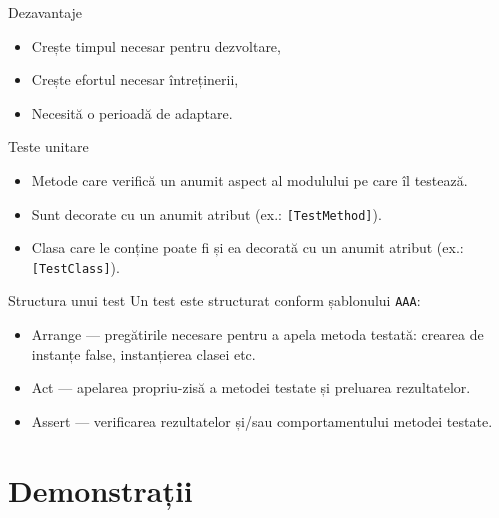 \documentclass[presentation]{beamer}
\begin{document}
\begin{frame}[label={sec:org6d3e55e}]{Dezavantaje}
\begin{itemize}
\item Crește timpul necesar pentru dezvoltare,
\item Crește efortul necesar întreținerii,
\item Necesită o perioadă de adaptare.
\end{itemize}
\end{frame}
\begin{frame}[label={sec:orgfd52fc0},fragile]{Teste unitare}
 \begin{itemize}
\item Metode care verifică un anumit aspect al modulului pe care îl testează.
\item Sunt decorate cu un anumit atribut (ex.: \texttt{[TestMethod]}).
\item Clasa care le conține poate fi și ea decorată cu un anumit atribut (ex.: \texttt{[TestClass]}).
\end{itemize}
\end{frame}
\begin{frame}[label={sec:org8d98d5e},fragile]{Structura unui test}
 Un test este structurat conform șablonului \texttt{AAA}:
\begin{itemize}
\item \alert{Arrange}  --- pregătirile necesare pentru a apela metoda testată: crearea de instanțe false, instanțierea clasei etc.
\item \alert{Act} --- apelarea propriu-zisă a metodei testate și preluarea rezultatelor.
\item \alert{Assert} --- verificarea rezultatelor și/sau comportamentului metodei testate.
\end{itemize}
\end{frame}
\section{Demonstrații}
\label{sec:org8152035}
\end{document}
